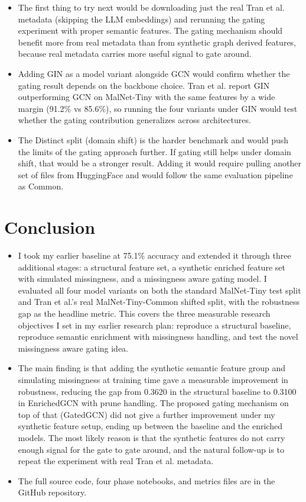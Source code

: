 \documentclass[12pt]{article}
\begin{document}
\begin{itemize}
    \item The first thing to try next would be downloading just the real Tran et al. metadata (skipping the LLM embeddings) and rerunning the gating experiment with proper semantic features. The gating mechanism should benefit more from real metadata than from synthetic graph derived features, because real metadata carries more useful signal to gate around.
    \item Adding GIN as a model variant alongside GCN would confirm whether the gating result depends on the backbone choice. Tran et al. \cite{tran2025} report GIN outperforming GCN on MalNet-Tiny with the same features by a wide margin (91.2\% vs 85.6\%), so running the four variants under GIN would test whether the gating contribution generalizes across architectures.
    \item The Distinct split (domain shift) is the harder benchmark and would push the limits of the gating approach further. If gating still helps under domain shift, that would be a stronger result. Adding it would require pulling another set of files from HuggingFace and would follow the same evaluation pipeline as Common.
\end{itemize}

\section{Conclusion}

\begin{itemize}
    \item I took my earlier baseline at 75.1\% accuracy and extended it through three additional stages: a structural feature set, a synthetic enriched feature set with simulated missingness, and a missingness aware gating model. I evaluated all four model variants on both the standard MalNet-Tiny test split and Tran et al.'s real MalNet-Tiny-Common shifted split, with the robustness gap as the headline metric. This covers the three measurable research objectives I set in my earlier research plan: reproduce a structural baseline, reproduce semantic enrichment with missingness handling, and test the novel missingness aware gating idea.
    \item The main finding is that adding the synthetic semantic feature group and simulating missingness at training time gave a measurable improvement in robustness, reducing the gap from 0.3620 in the structural baseline to 0.3100 in EnrichedGCN with prune handling. The proposed gating mechanism on top of that (GatedGCN) did not give a further improvement under my synthetic feature setup, ending up between the baseline and the enriched models. The most likely reason is that the synthetic features do not carry enough signal for the gate to gate around, and the natural follow-up is to repeat the experiment with real Tran et al. metadata.
    \item The full source code, four phase notebooks, and metrics files are in the GitHub repository.
\end{itemize}
\end{document}

